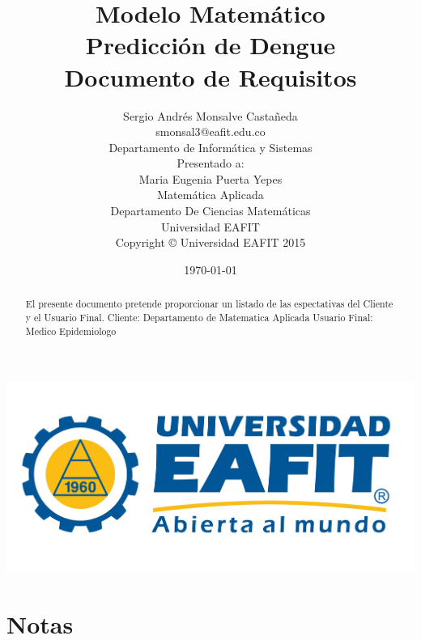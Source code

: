 \documentclass[twoside,letterpaper,12pt]{report}
\author{
Sergio Andrés Monsalve Castañeda \\
smonsal3@eafit.edu.co\\
Departamento de Informática y Sistemas \\[1cm]
Presentado a:\\
Maria Eugenia Puerta Yepes\\[0.2cm]
Matemática Aplicada\\
Departamento De Ciencias Matemáticas\\
Universidad EAFIT\\[3cm] 
Copyright \copyright \hspace{3pt} Universidad EAFIT 2015
}
\title{ \textbf{Modelo Matemático\\ Predicción de Dengue}\\
Documento de Requisitos\\
}
\date{\today}
\begin{document}
\maketitle

\tableofcontents

\pagestyle{fancyplain}
\fancyhf{}
\headheight=30pt %
\renewcommand{\headrulewidth}{0pt} %

\lhead %
{
\begin{minipage}{2cm}
\includegraphics[width=1.5 in]{aux/Logo_EAFIT.jpg}
\end{minipage}
}

\fancyfoot[c]{\thepage}

\begin{abstract}
El presente documento pretende proporcionar un listado de las espectativas del Cliente y el Usuario Final.
Cliente: Departamento de Matematica Aplicada 
Usuario Final: Medico Epidemiologo
\end{abstract}

 






\appendix
\chapter{Notas}

\end{document}
